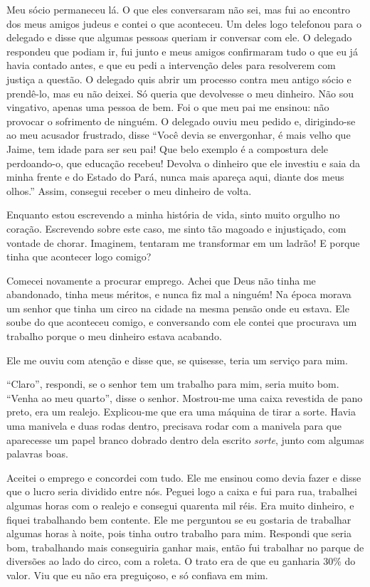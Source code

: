 Meu sócio permaneceu lá. O que eles conversaram não sei, mas fui ao
encontro dos meus amigos judeus e contei o que aconteceu. Um deles
logo telefonou para o delegado e disse que algumas pessoas queriam ir
conversar com ele. O delegado respondeu que podiam ir, fui junto e 
meus amigos confirmaram tudo o que eu já havia contado antes, e que eu
pedi a intervenção deles para resolverem com justiça a questão. O
delegado quis abrir um processo contra meu antigo sócio e prendê-lo,
mas eu não deixei. Só queria que devolvesse o meu dinheiro. Não sou
vingativo, apenas uma pessoa de bem. Foi o que meu pai me ensinou: não
provocar o sofrimento de ninguém. O delegado ouviu meu pedido e,
dirigindo-se ao meu acusador frustrado, disse ``Você devia se
envergonhar, é mais velho que Jaime, tem idade para ser seu pai! Que
belo exemplo é a compostura dele perdoando-o, que educação recebeu!
Devolva o dinheiro que ele investiu e saia da minha frente e do Estado
do Pará, nunca mais apareça aqui, diante dos meus olhos.'' Assim, 
consegui receber o meu dinheiro de volta.

Enquanto estou escrevendo a minha história de vida, sinto muito orgulho
no coração. Escrevendo sobre este caso, me sinto tão magoado e
injustiçado, com vontade de chorar. Imaginem, tentaram me transformar em
um ladrão! E porque tinha que acontecer logo comigo?

Comecei novamente a procurar emprego. Achei
que Deus não tinha me abandonado, tinha meus méritos, e nunca fiz 
mal a ninguém! Na época morava
um senhor que tinha um circo na cidade na mesma pensão onde eu estava. Ele soube do que
aconteceu comigo, e conversando com ele contei que procurava um trabalho
porque o meu dinheiro estava acabando.

Ele me ouviu com atenção e disse que, se quisesse, teria um serviço para
mim.

``Claro'', respondi, se o senhor tem um trabalho para mim, seria muito
bom. ``Venha ao meu quarto'', disse o senhor. Mostrou-me uma caixa
revestida de pano preto, era um realejo. Explicou-me que era uma máquina
de tirar a sorte. Havia uma manivela e duas rodas dentro, precisava 
rodar com a manivela para que aparecesse um papel branco dobrado dentro
dela escrito \textit{sorte}, junto com algumas palavras boas.

Aceitei o emprego e concordei com tudo. Ele me ensinou como devia fazer
e disse que o lucro seria dividido entre nós. Peguei logo a caixa e
fui para rua, trabalhei algumas horas com o realejo e consegui quarenta
mil réis. Era muito dinheiro, e fiquei trabalhando bem contente.
Ele me perguntou se eu gostaria de trabalhar algumas horas à noite, pois
tinha outro trabalho para mim. Respondi que seria bom, trabalhando mais
conseguiria ganhar mais, então fui trabalhar no parque de diversões ao
lado do circo, com a roleta. O trato era de que eu ganharia 30\% do valor. Viu que eu
não era preguiçoso, e só confiava em mim.

